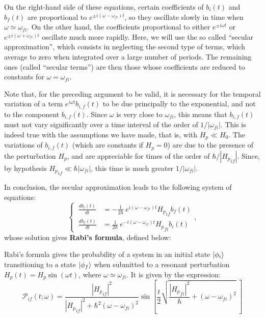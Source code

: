 On the right-hand side of these equations, certain coefficients of $b_i(t)$ and $b_f(t)$ are proportional to $e^{\pm i(\omega-\omega_{fi})t}$, so they oscillate slowly in time when $\omega\simeq \omega_{fi}$. On the other hand, the coefficients proportional to either $e^{\pm i\omega t}$ or $e^{\pm i(\omega+\omega_{fi})t}$ oscillate much more rapidly. Here, we will use the so called ``secular approximation'', which consists in neglecting the second type of terms, which average to zero when integrated over a large number of periods. The remaining ones (called ``secular terms'') are then those whose coefficients are reduced to constants for $\omega = \omega_{fi}$.

Note that, for the preceding argument to be valid, it is necessary for the temporal variation of a term $e^{i\omega t}b_{i,f}(t)$ to be due principally to the exponential, and not to the component $b_{i,f}(t)$. Since $\omega$ is very close to $\omega_{fi}$, this means that $b_{i,f}(t)$ must not vary significantly over a time interval of the order of $1/|\omega_{fi}|$. This is indeed true with the assumptions we have made, that is, with $H_p \ll H_0$. The variations of $b_{i,f}(t)$ (which are constants if $H_p= 0$) are due to the presence of the perturbation $H_p$, and are appreciable for times of the order of $\hbar / |{H_p}_{if}|$. Since, by hypothesis ${H_p}_{if}\ll\hbar |\omega_{fi}|$, this time is much greater $1/|\omega_{fi}|$.

In conclusion, the secular approximation leads to the following system of equations:
\begin{equation}
    \left\{\ 
    \begin{aligned}
        \frac{db_i(t)}{dt} &= -\frac{1}{2\hbar}\ e^{i(\omega - \omega_{fi}) t}{H_p}_{if}b_f (t)\\
        \frac{db_f(t)}{dt} &= \frac{1}{2\hbar}\ e^{-i(\omega - \omega_{if}) t}{H_p}_{fi}b_i (t) 
    \end{aligned}\right.,
\end{equation}
whose solution gives \textbf{Rabi's formula}, defined below:
\begin{definition}
    Rabi's formula gives the probability of a system in an initial state $\ket{\phi_i}$ transitioning to a state $\ket{\phi_f}$ when submitted to a resonant perturbation $H_p(t) = H_p \sin(\omega t)$, where $\omega \simeq \omega_{fi}$. It is given by the expression:
    \begin{equation}
        \mathcal{P}_{if}(t;\omega) = \frac{|{H_p}_{if}|^2}{|{H_p}_{if}|^2 + \hbar^2(\omega-\omega_{fi})^2} \sin \left[\frac{t}{2}\sqrt{\frac{|{H_p}_{fi}|^2}{\hbar} + (\omega-\omega_{fi})^2}\ \right]
    \end{equation}
\end{definition}

